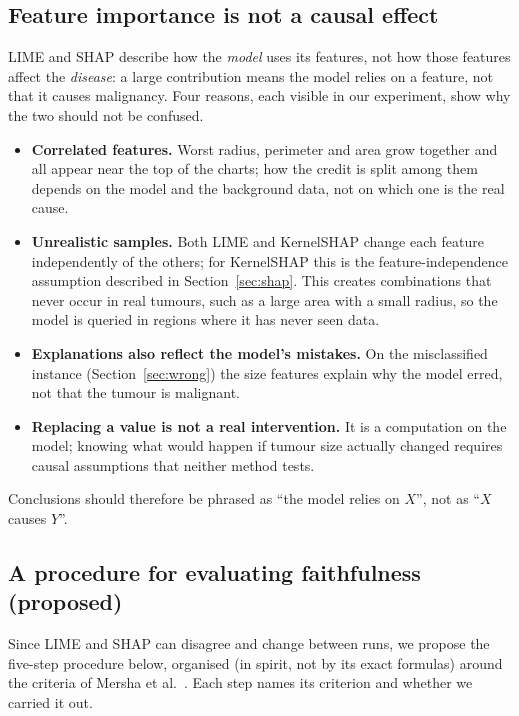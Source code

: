 \documentclass[11pt,a4paper]{article}
\begin{document}
\subsection{Feature importance is not a causal effect}
\label{sec:causal}
LIME and SHAP describe how the \emph{model} uses its features, not how those
features affect the \emph{disease}: a large contribution means the model
relies on a feature, not that it causes malignancy. Four reasons, each visible in our experiment, show why the two should not be confused.

\begin{itemize}
  \item \textbf{Correlated features.} Worst radius, perimeter and area grow
        together and all appear near the top of the charts; how the credit is
        split among them depends on the model and the background data, not on
        which one is the real cause.
  \item \textbf{Unrealistic samples.} Both LIME and KernelSHAP change each feature 
        independently of the others; for KernelSHAP this is the feature-independence 
        assumption described in Section~\ref{sec:shap}. This creates combinations that never occur 
        in real tumours, such as a large area with a small radius, so the model is 
        queried in regions where it has never seen data.
  \item \textbf{Explanations also reflect the model's mistakes.} On the
        misclassified instance (Section~\ref{sec:wrong}) the size features
        explain why the model erred, not that the tumour is malignant.
  \item \textbf{Replacing a value is not a real intervention.} It is a
        computation on the model; knowing what would happen if tumour size
        actually changed requires causal assumptions that neither method tests.
\end{itemize}
Conclusions should therefore be phrased as ``the model relies on $X$'', not as
``$X$ causes $Y$''.

\subsection{A procedure for evaluating faithfulness (proposed)}\label{sec:proc}
Since LIME and SHAP can disagree and change between runs, we propose the
five-step procedure below, organised (in spirit, not by its exact formulas)
around the criteria of Mersha et al.~\cite{mersha}. Each step names its
criterion and whether we carried it out.
\end{document}
